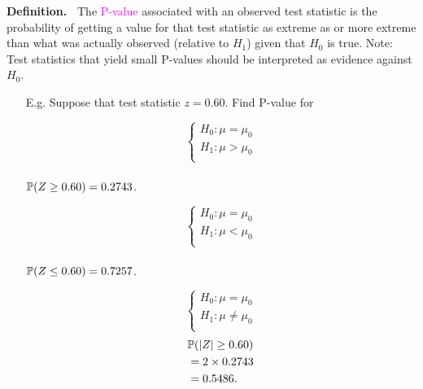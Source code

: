 \begin{frame}

{\bf Definition.~} The \textcolor{magenta}{P-value} associated with an observed test statistic is the
probability of getting a value for that test statistic as extreme as or more
extreme than what was actually observed (relative to $H_1$) given that $H_0$ is
true.
\pause
\vfill
Note: Test statistics that yield small P-values should be interpreted as evidence
against $H_0$.
\vfill
\pause
\begin{enumerate}
 \item[E.g. ] Suppose that test statistic $z=0.60$. Find P-value for
 \begin{minipage}{0.3\textwidth}
 \[
 \begin{cases}
     H_0: \mu= \mu_0 \\
     H_1: \mu> \mu_0 \\
 \end{cases}
 \]
 \\[3.3em]\pause
 $\mathbb{P}(Z\ge 0.60)=0.2743$.
\end{minipage}
\hfill\pause
\begin{minipage}{0.3\textwidth}
 \[
 \begin{cases}
     H_0: \mu= \mu_0 \\
     H_1: \mu< \mu_0 \\
 \end{cases}
 \]
 \\[3.3em]\pause
 $\mathbb{P}(Z\le 0.60)=0.7257$.
\end{minipage}\pause
\begin{minipage}{0.3\textwidth}
 \[
 \begin{cases}
     H_0: \mu= \mu_0 \\
     H_1: \mu\ne \mu_0 \\
 \end{cases}
  \]\pause
 \begin{align*}
   &\mathbb{P}(|Z|\ge 0.60)\\
   & =2\times 0.2743  \\
   &=0.5486.
 \end{align*}
\end{minipage}
\end{enumerate}
\end{frame}

